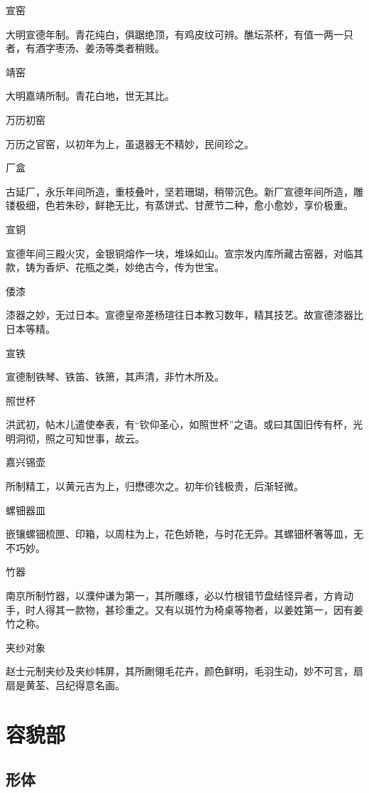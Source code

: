 \documentclass[a4paper,12pt,UTF8,twoside]{ctexbook}
\begin{document}
    宣窑
    
    大明宣德年制。青花纯白，俱踞绝顶，有鸡皮纹可辨。醮坛茶杯，有值一两一只者，有酒字枣汤、姜汤等类者稍贱。
    
    靖窑
    
    大明嘉靖所制。青花白地，世无其比。
    
    万历初窑
    
    万历之官窑，以初年为上，虽退器无不精妙，民间珍之。
    
    厂盒
    
    古延厂，永乐年间所造，重枝叠叶，坚若珊瑚，稍带沉色。新厂宣德年间所造，雕镂极细，色若朱砂，鲜艳无比，有蒸饼式、甘蔗节二种，愈小愈妙，享价极重。
    
    宣铜
    
    宣德年间三殿火灾，金银铜熔作一块，堆垛如山。宣宗发内库所藏古窑器，对临其款，铸为香炉、花瓶之类，妙绝古今，传为世宝。
    
    倭漆
    
    漆器之妙，无过日本。宣德皇帝差杨瑄往日本教习数年，精其技艺。故宣德漆器比日本等精。
    
    宣铁
    
    宣德制铁琴、铁笛、铁箫，其声清，非竹木所及。
    
    照世杯
    
    洪武初，帖木儿遣使奉表，有“钦仰圣心，如照世杯”之语。或曰其国旧传有杯，光明洞彻，照之可知世事，故云。
    
    嘉兴锡壶
    
    所制精工，以黄元吉为上，归懋德次之。初年价钱极贵，后渐轻微。
    
    螺钿器皿
    
    嵌镶螺钿梳匣、印箱，以周柱为上，花色娇艳，与时花无异。其螺钿杯箸等皿，无不巧妙。
    
    竹器
    
    南京所制竹器，以濮仲谦为第一，其所雕琢，必以竹根错节盘结怪异者，方肯动手，时人得其一款物，甚珍重之。又有以斑竹为椅桌等物者，以姜姓第一，因有姜竹之称。
    
    夹纱对象
    
    赵士元制夹纱及夹纱帏屏，其所劂翎毛花卉，颜色鲜明，毛羽生动，妙不可言，扇扇是黄荃、吕纪得意名画。
    
    \part{容貌部}
    
    \chapter{形体}
    
\end{document}
